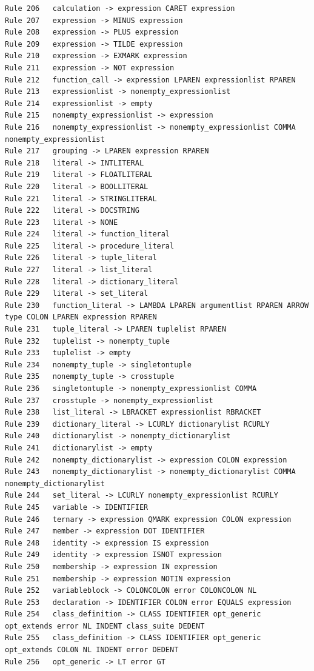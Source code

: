 \documentclass{article}
\begin{document}
\begin{verbatim}
Rule 206   calculation -> expression CARET expression
Rule 207   expression -> MINUS expression
Rule 208   expression -> PLUS expression
Rule 209   expression -> TILDE expression
Rule 210   expression -> EXMARK expression
Rule 211   expression -> NOT expression
Rule 212   function_call -> expression LPAREN expressionlist RPAREN
Rule 213   expressionlist -> nonempty_expressionlist
Rule 214   expressionlist -> empty
Rule 215   nonempty_expressionlist -> expression
Rule 216   nonempty_expressionlist -> nonempty_expressionlist COMMA nonempty_expressionlist
Rule 217   grouping -> LPAREN expression RPAREN
Rule 218   literal -> INTLITERAL
Rule 219   literal -> FLOATLITERAL
Rule 220   literal -> BOOLLITERAL
Rule 221   literal -> STRINGLITERAL
Rule 222   literal -> DOCSTRING
Rule 223   literal -> NONE
Rule 224   literal -> function_literal
Rule 225   literal -> procedure_literal
Rule 226   literal -> tuple_literal
Rule 227   literal -> list_literal
Rule 228   literal -> dictionary_literal
Rule 229   literal -> set_literal
Rule 230   function_literal -> LAMBDA LPAREN argumentlist RPAREN ARROW type COLON LPAREN expression RPAREN
Rule 231   tuple_literal -> LPAREN tuplelist RPAREN
Rule 232   tuplelist -> nonempty_tuple
Rule 233   tuplelist -> empty
Rule 234   nonempty_tuple -> singletontuple
Rule 235   nonempty_tuple -> crosstuple
Rule 236   singletontuple -> nonempty_expressionlist COMMA
Rule 237   crosstuple -> nonempty_expressionlist
Rule 238   list_literal -> LBRACKET expressionlist RBRACKET
Rule 239   dictionary_literal -> LCURLY dictionarylist RCURLY
Rule 240   dictionarylist -> nonempty_dictionarylist
Rule 241   dictionarylist -> empty
Rule 242   nonempty_dictionarylist -> expression COLON expression
Rule 243   nonempty_dictionarylist -> nonempty_dictionarylist COMMA nonempty_dictionarylist
Rule 244   set_literal -> LCURLY nonempty_expressionlist RCURLY
Rule 245   variable -> IDENTIFIER
Rule 246   ternary -> expression QMARK expression COLON expression
Rule 247   member -> expression DOT IDENTIFIER
Rule 248   identity -> expression IS expression
Rule 249   identity -> expression ISNOT expression
Rule 250   membership -> expression IN expression
Rule 251   membership -> expression NOTIN expression
Rule 252   variableblock -> COLONCOLON error COLONCOLON NL
Rule 253   declaration -> IDENTIFIER COLON error EQUALS expression
Rule 254   class_definition -> CLASS IDENTIFIER opt_generic opt_extends error NL INDENT class_suite DEDENT
Rule 255   class_definition -> CLASS IDENTIFIER opt_generic opt_extends COLON NL INDENT error DEDENT
Rule 256   opt_generic -> LT error GT

\end{verbatim}
\end{document}
